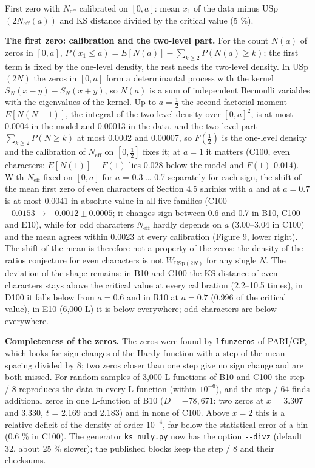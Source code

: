 \documentclass[
  10pt,
]{article}
\begin{document}
First zero with \(N_{\mathrm{eff}}\) calibrated on \([0, a]\): mean
\(x_1\) of the data minus USp\((2N_{\mathrm{eff}}(a))\) and KS distance
divided by the critical value (5 \%).

\textbf{The first zero: calibration and the two-level part.} For the
count \(N(a)\) of zeros in \([0, a]\),
\(P(x_1 \le a) = E[N(a)] - \sum_{k \ge 2} P(N(a) \ge k)\); the first
term is fixed by the one-level density, the rest needs the two-level
density. In USp\((2N)\) the zeros in \([0, a]\) form a determinantal
process with the kernel \(S_N(x - y) - S_N(x + y)\), so \(N(a)\) is a
sum of independent Bernoulli variables with the eigenvalues of the
kernel. Up to \(a = \frac12\) the second factorial moment
\(E[N(N - 1)]\), the integral of the two-level density over
\([0, a]^2\), is at most 0.0004 in the model and 0.00013 in the data,
and the two-level part \(\sum_{k \ge 2} P(N \ge k)\) at most 0.0002 and
0.00007, so \(F(\frac12)\) is the one-level density and the calibration
of \(N_{\mathrm{eff}}\) on \([0, \frac12]\) fixes it; at \(a = 1\) it
matters (C100, even characters: \(E[N(1)] - F(1)\) lies 0.028 below the
model and \(F(1)\) 0.014). With \(N_{\mathrm{eff}}\) fixed on \([0, a]\)
for \(a\) = 0.3 \ldots{} 0.7 separately for each sign, the shift of the
mean first zero of even characters of Section 4.5 shrinks with \(a\) and
at \(a = 0.7\) is at most 0.0041 in absolute value in all five families
(C100 \(+0.0153 \to -0.0012 \pm 0.0005\); it changes sign between 0.6
and 0.7 in B10, C100 and E10), while for odd characters
\(N_{\mathrm{eff}}\) hardly depends on \(a\) (3.00--3.04 in C100) and
the mean agrees within 0.0023 at every calibration (Figure 9, lower
right). The shift of the mean is therefore not a property of the zeros:
the density of the ratios conjecture for even characters is not
\(W_{\mathrm{USp}(2N)}\) for any single \(N\). The deviation of the
shape remains: in B10 and C100 the KS distance of even characters stays
above the critical value at every calibration (2.2--10.5 times), in D100
it falls below from \(a = 0.6\) and in R10 at \(a = 0.7\) (0.996 of the
critical value), in E10 (6,000 L) it is below everywhere; odd characters
are below everywhere.

\textbf{Completeness of the zeros.} The zeros were found by
\texttt{lfunzeros} of PARI/GP, which looks for sign changes of the Hardy
function with a step of the mean spacing divided by 8; two zeros closer
than one step give no sign change and are both missed. For random
samples of 3,000 L-functions of B10 and C100 the step / 8 reproduces the
data in every L-function (within \(10^{-6}\)), and the step / 64 finds
additional zeros in one L-function of B10 (\(D = -78{,}671\): two zeros
at \(x\) = 3.307 and 3.330, \(t\) = 2.169 and 2.183) and in none of
C100. Above \(x = 2\) this is a relative deficit of the density of order
\(10^{-4}\), far below the statistical error of a bin (0.6 \% in C100).
The generator \texttt{ks\_nuly.py} now has the option \texttt{-\/-divz}
(default 32, about 25 \% slower); the published blocks keep the step / 8
and their checksums.
\end{document}

